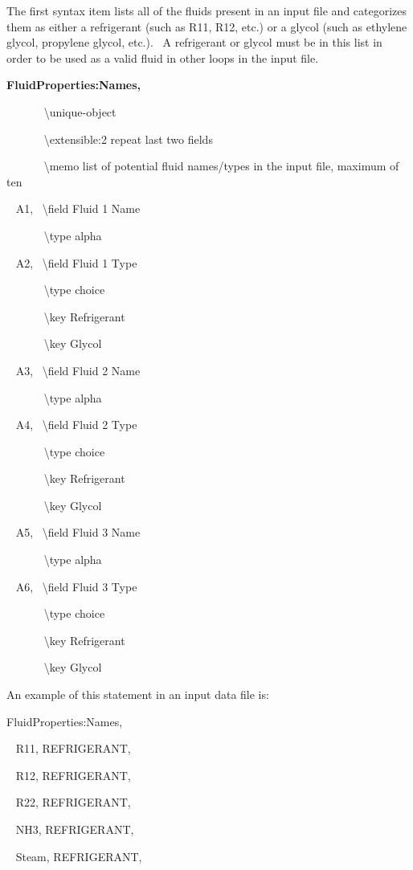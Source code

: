 The first syntax item lists all of the fluids present in an input file and categorizes them as either a refrigerant (such as R11, R12, etc.) or a glycol (such as ethylene glycol, propylene glycol, etc.).~ A refrigerant or glycol must be in this list in order to be used as a valid fluid in other loops in the input file.

\textbf{FluidProperties:Names,}

~~~~~~ \textbackslash{}unique-object

~~~~~~ \textbackslash{}extensible:2 repeat last two fields

~~~~~~ \textbackslash{}memo list of potential fluid names/types in the input file, maximum of ten

~ A1,~ \textbackslash{}field Fluid 1 Name

~~~~~~ \textbackslash{}type alpha

~ A2,~ \textbackslash{}field Fluid 1 Type

~~~~~~ \textbackslash{}type choice

~~~~~~ \textbackslash{}key Refrigerant

~~~~~~ \textbackslash{}key Glycol

~ A3,~ \textbackslash{}field Fluid 2 Name

~~~~~~ \textbackslash{}type alpha

~ A4,~ \textbackslash{}field Fluid 2 Type

~~~~~~ \textbackslash{}type choice

~~~~~~ \textbackslash{}key Refrigerant

~~~~~~ \textbackslash{}key Glycol

~ A5,~ \textbackslash{}field Fluid 3 Name

~~~~~~ \textbackslash{}type alpha

~ A6,~ \textbackslash{}field Fluid 3 Type

~~~~~~ \textbackslash{}type choice

~~~~~~ \textbackslash{}key Refrigerant

~~~~~~ \textbackslash{}key Glycol

An example of this statement in an input data file is:

FluidProperties:Names,

~ R11, REFRIGERANT,

~ R12, REFRIGERANT,

~ R22, REFRIGERANT,

~ NH3, REFRIGERANT,

~ Steam, REFRIGERANT,

